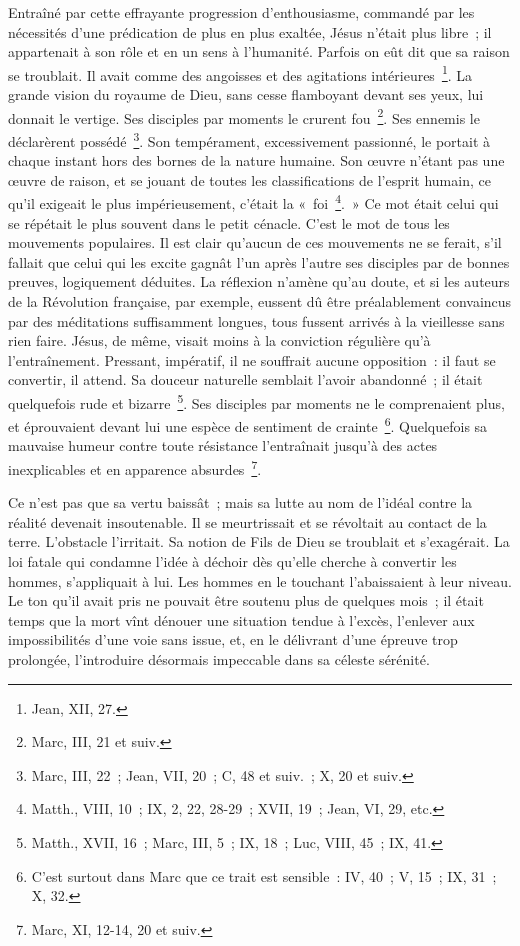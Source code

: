\documentclass[french,twoside]{book} %
\newcommand\chapterclose{} %
\begin{document}
Entraîné par cette effrayante progression d’enthousiasme, commandé par les nécessités d’une prédication de plus en plus exaltée, Jésus n’était plus libre ; il appartenait à son rôle et en un sens à l’humanité. Parfois on eût dit que sa raison se troublait. Il avait comme des angoisses et des agitations intérieures \footnote{Jean, XII, 27.}. La grande vision du royaume de Dieu, sans cesse flamboyant devant ses yeux, lui donnait le vertige. Ses disciples par moments le crurent fou \footnote{Marc, III, 21 et suiv.}. Ses ennemis le déclarèrent possédé \footnote{Marc, III, 22 ; Jean, VII, 20 ; C, 48 et suiv. ; X, 20 et suiv.}. Son tempérament, excessivement passionné, le portait à chaque instant hors des bornes de la nature humaine. Son œuvre n’étant pas une œuvre de raison, et se jouant de toutes les classifications de l’esprit humain, ce qu’il exigeait le plus impérieusement, c’était la « foi \footnote{Matth., VIII, 10 ; IX, 2, 22, 28-29 ; XVII, 19 ; Jean, VI, 29, etc.}. » Ce mot était celui qui se répétait le plus souvent dans le petit cénacle. C’est le mot de tous les mouvements populaires. Il est clair qu’aucun de ces mouvements ne se ferait, s’il fallait que celui qui les excite gagnât l’un après l’autre ses disciples par de bonnes preuves, logiquement déduites. La réflexion n’amène qu’au doute, et si les auteurs de la Révolution française, par exemple, eussent dû être préalablement convaincus par des méditations suffisamment longues, tous fussent arrivés à la vieillesse sans rien faire. Jésus, de même, visait moins à la conviction régulière qu’à l’entraînement. Pressant, impératif, il ne souffrait aucune opposition : il faut se convertir, il attend. Sa douceur naturelle semblait l’avoir abandonné ; il était quelquefois rude et bizarre \footnote{Matth., XVII, 16 ; Marc, III, 5 ; IX, 18 ; Luc, VIII, 45 ; IX, 41.}. Ses disciples par moments ne le comprenaient plus, et éprouvaient devant lui une espèce de sentiment de crainte \footnote{C’est surtout dans Marc que ce trait est sensible : IV, 40 ; V, 15 ; IX, 31 ; X, 32.}. Quelquefois sa mauvaise humeur contre toute résistance l’entraînait jusqu’à des actes inexplicables et en apparence absurdes \footnote{Marc, XI, 12-14, 20 et suiv.}.\par
Ce n’est pas que sa vertu baissât ; mais sa lutte au nom de l’idéal contre la réalité devenait insoutenable. Il se meurtrissait et se révoltait au contact de la terre. L’obstacle l’irritait. Sa notion de Fils de Dieu se troublait et s’exagérait. La loi fatale qui condamne l’idée à déchoir dès qu’elle cherche à convertir les hommes, s’appliquait à lui. Les hommes en le touchant l’abaissaient à leur niveau. Le ton qu’il avait pris ne pouvait être soutenu plus de quelques mois ; il était temps que la mort vînt dénouer une situation tendue à l’excès, l’enlever aux impossibilités d’une voie sans issue, et, en le délivrant d’une épreuve trop prolongée, l’introduire désormais impeccable dans sa céleste sérénité.
\chapterclose
\end{document}
